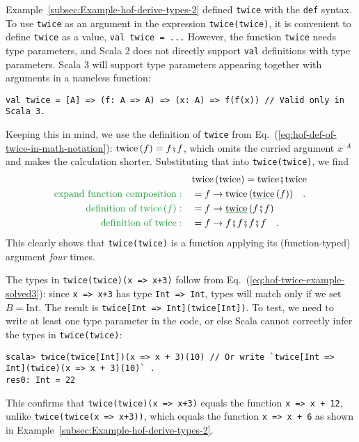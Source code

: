 Example~\ref{subsec:Example-hof-derive-types-2} defined \lstinline!twice!
with the \lstinline!def! syntax. To use \lstinline!twice! as an
argument in the expression \lstinline!twice(twice)!, it is convenient
to define \lstinline!twice! as a value, \lstinline!val twice = ...!
However, the function \lstinline!twice! needs type parameters, and
Scala 2 does not directly support \lstinline!val! definitions with
type parameters. Scala 3 will support type parameters appearing together
with arguments in a nameless function:
\begin{lstlisting}
val twice = [A] => (f: A => A) => (x: A) => f(f(x)) // Valid only in Scala 3.
\end{lstlisting}
Keeping this in mind, we use the definition of \lstinline!twice!
from Eq.~(\ref{eq:hof-def-of-twice-in-math-notation}): $\text{twice}\,(f)=f\bef f$,
which omits the curried argument $x^{:A}$ and makes the calculation
shorter. Substituting that into \lstinline!twice(twice)!, we find
\begin{align*}
 & \text{twice}\,(\text{twice})=\text{twice}\bef\text{twice}\\
{\color{greenunder}\text{expand function composition}:}\quad & =f\rightarrow\text{twice}\,(\gunderline{\text{twice}}\,(f))\quad.\\
{\color{greenunder}\text{definition of }\text{twice}\,(f):}\quad & =f\rightarrow\gunderline{\text{twice}}\,(f\bef f)\\
{\color{greenunder}\text{definition of twice}:}\quad & =f\rightarrow f\bef f\bef f\bef f\quad.
\end{align*}
This clearly shows that \lstinline!twice(twice)! is a function applying
its (function-typed) argument \emph{four} times.

The types in \lstinline!twice(twice)(x => x+3)! follow from Eq.~(\ref{eq:hof-twice-example-solved3}):
since \lstinline!x => x+3! has type \lstinline!Int => Int!, types
will match only if we set $B=\text{Int}$. The result is \lstinline!twice[Int => Int](twice[Int])!.
To test, we need to write at least one type parameter in the code,
or else Scala cannot correctly infer the types in \lstinline!twice(twice)!:
\begin{lstlisting}
scala> twice(twice[Int])(x => x + 3)(10) // Or write `twice[Int => Int](twice)(x => x + 3)(10)` .
res0: Int = 22
\end{lstlisting}
This confirms that \lstinline!twice(twice)(x => x+3)! equals the
function \lstinline!x => x + 12!, unlike \lstinline!twice(twice(x => x+3))!,
which equals the function \lstinline!x => x + 6! as shown in Example~\ref{subsec:Example-hof-derive-types-2}.


